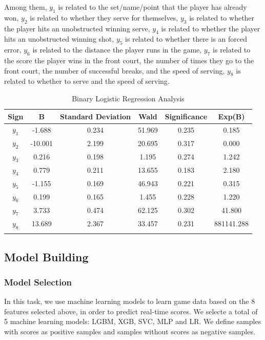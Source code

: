 \documentclass{mcmthesis}
\begin{document}
Among them, $y_1$ is related to the set/name/point that the player has already won, $y_2$ is related to whether they serve for themselves, $y_3$ is related to whether the player hits an unobstructed winning serve, $y_4$ is related to whether the player hits an unobstructed winning shot, $y_5$ is related to whether there is an forced error, $y_6$ is related to the distance the player runs in the game, $y_7$ is related to the score the player wins in the front court, the number of times they go to the front court, the number of successful breaks, and the speed of serving, $y_8$ is related to whether to serve and the speed of serving.
\begin{longtable}[c]{cccccc}
	\toprule
	\textbf{Sign}  & \textbf{B}       & \textbf{Standard Deviation} & \textbf{Wald}   & \textbf{Significance} & \textbf{Exp(B)}     \\* \midrule
	\endfirsthead
	\endhead
	$y_1$ & -1.688  & 0.234              & 51.969 & 0.235        & 0.185      \\* \midrule
	$y_2$ & -10.001 & 2.199              & 20.695 & 0.317        & 0.000      \\* \midrule
	$y_3$ & 0.216   & 0.198              & 1.195  & 0.274        & 1.242      \\* \midrule
	$y_4$ & 0.779   & 0.211              & 13.655 & 0.183        & 2.180      \\* \midrule
	$y_5$ & -1.155  & 0.169              & 46.943 & 0.221        & 0.315      \\* \midrule
	$y_6$ & 0.199   & 0.165              & 1.455  & 0.228        & 1.220      \\* \midrule
	$y_7$ & 3.733   & 0.474              & 62.125 & 0.302        & 41.800     \\* \midrule
	$y_8$ & 13.689  & 2.367              & 33.457 & 0.231        & 881141.288 \\* \bottomrule
	\caption{Binary Logistic Regression Analysis}
	\label{tab:my-table}
\end{longtable}



\subsection{Model Building}
\subsubsection{Model Selection}
In this task, we use machine learning models to learn game data based on the 8 features selected above, in order to predict real-time scores. We selecte a total of 5 machine learning models: LGBM, XGB, SVC, MLP and LR. We define samples with scores as positive samples and samples without scores as negative samples. 
\end{document}

